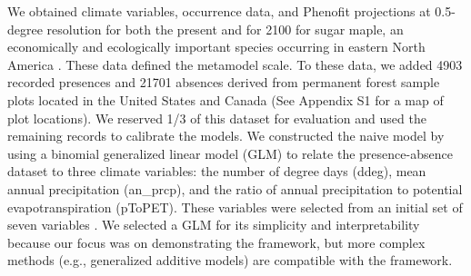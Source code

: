 \documentclass[11pt]{article}
\begin{document}
We obtained climate variables, occurrence data, and Phenofit projections at 0.5-degree resolution for both the present and for 2100 for sugar maple, an economically and ecologically important species occurring in eastern North America \citep{Morin2009}.
These data defined the metamodel scale.
To these data, we added 4903 recorded presences and 21701 absences derived from permanent forest sample plots located in the United States and Canada (See Appendix S1 for a map of plot locations).
We reserved 1/3 of this dataset for evaluation and used the remaining records to calibrate the models.
We constructed the naive model by using a binomial generalized linear model (GLM) to relate the presence-absence dataset to three climate variables: the number of degree days (ddeg), mean annual precipitation (an\_prcp), and the ratio of annual precipitation to potential evapotranspiration (pToPET).
These variables were selected from an initial set of seven variables \citep[see Appendix S1 and ][for details on the climate variables]{Morin2009}.
We selected a GLM for its simplicity and interpretability because our focus was on demonstrating the framework, but more complex methods (e.g., generalized additive models) are compatible with the framework.
\end{document}
